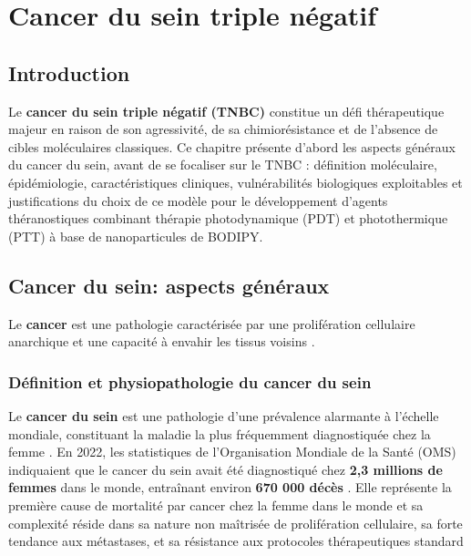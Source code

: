 \chapter{Cancer du sein triple négatif}

\section*{Introduction}

Le \textbf{cancer du sein triple négatif (TNBC)} constitue un défi thérapeutique majeur en raison de son agressivité, de sa chimiorésistance et de l’absence de cibles moléculaires classiques. Ce chapitre présente d’abord les aspects généraux du cancer du sein, avant de se focaliser sur le TNBC : définition moléculaire, épidémiologie, caractéristiques cliniques, vulnérabilités biologiques exploitables et justifications du choix de ce modèle pour le développement d’agents théranostiques combinant thérapie photodynamique (PDT) et photothermique (PTT) à base de nanoparticules de BODIPY.

\section{Cancer du sein: aspects généraux}\label{sec:TBNC_g }

Le \textbf{cancer} est une pathologie caractérisée par une prolifération cellulaire anarchique et une capacité à envahir les tissus voisins  \cite{Hanahan2011, Das2023, Ma2025}. 

\subsection{ Définition et physiopathologie du cancer du sein}

Le \textbf{cancer du sein } est une pathologie d'une prévalence alarmante à l'échelle mondiale, constituant la maladie la plus fréquemment diagnostiquée chez la femme \cite{Schaefer2025, Liu2025}. En 2022, les statistiques de l'Organisation Mondiale de la Santé (OMS) indiquaient que le cancer du sein avait été diagnostiqué chez \textbf{2,3 millions de femmes} dans le monde, entraînant environ \textbf{670 000 décès} \cite{Ailioaie2025}. Elle représente la première cause de mortalité par cancer chez la femme dans le monde \cite{Ailioaie2025} et sa complexité  réside dans sa nature non maîtrisée de prolifération cellulaire, sa forte tendance aux métastases, et sa résistance aux protocoles thérapeutiques standard \cite{Kumar2025}

